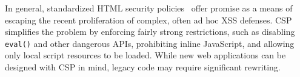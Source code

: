 In general, standardized HTML security
policies~\cite{stamm10:csp,weinberger11:client} offer promise as a
means of escaping the recent proliferation of complex, often ad hoc
XSS defenses. CSP simplifies the problem by enforcing fairly strong
restrictions, such as disabling \texttt{eval()} and other dangerous
APIs, prohibiting inline JavaScript, and allowing only local script
resources to be loaded. While new web applications can be designed
with CSP in mind, legacy code may require significant rewriting.

